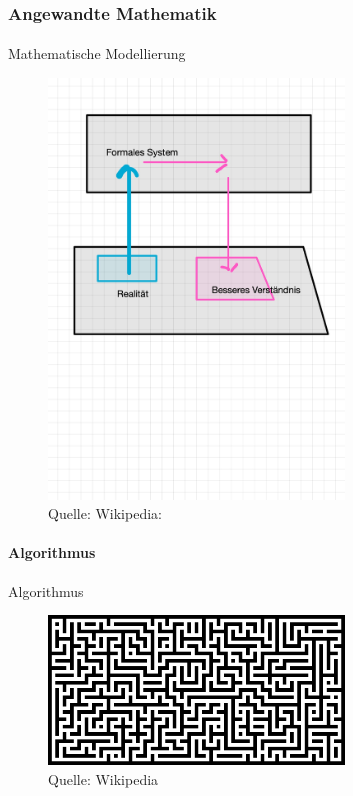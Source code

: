\documentclass{beamer}
\begin{document}
\begin{frame}
    \frametitle{Angewandte Mathematik}
\framesubtitle{}
    \begin{block}{Mathematische Modellierung}
\begin{figure}[H]
      \centering
    \includegraphics[width=0.7\textwidth]{images/modellierung}
      \caption{Quelle: Wikipedia: }
\end{figure}
\end{block}
 \end{frame}


\begin{frame}
\framesubtitle{Algorithmus}
    \begin{block}{Algorithmus}
\begin{figure}[H]
      \centering
    \includegraphics[width=0.7\textwidth]{images/algo}
      \caption{Quelle: Wikipedia}
\end{figure}
\end{block}

 \end{frame}
\end{document}
